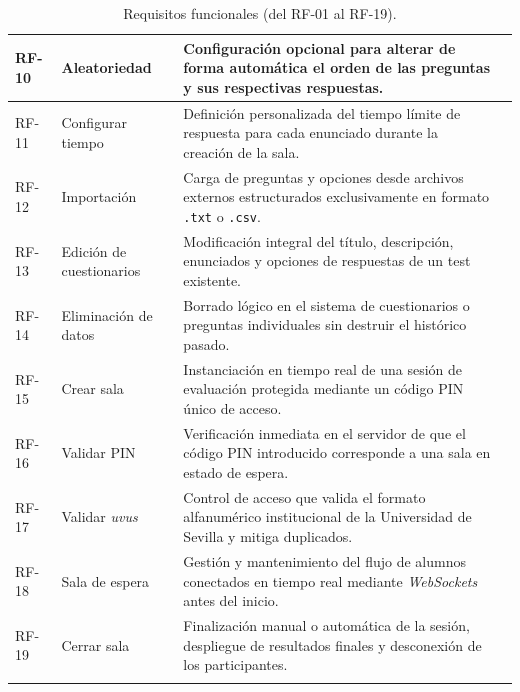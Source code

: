 \begin{table}[H]
{\begin{tabularx}{1.1\textwidth}{l P{2.4cm} Y c}
RF-10\label{req:10} & Aleatoriedad & Configuración opcional para alterar de forma automática el orden de las preguntas y sus respectivas respuestas. &  \\ \hline
RF-11\label{req:11} & Configurar tiempo & Definición personalizada del tiempo límite de respuesta para cada enunciado durante la creación de la sala. &  \\ \hline
RF-12\label{req:12} & Importación & Carga de preguntas y opciones desde archivos externos estructurados exclusivamente en formato \texttt{.txt} o \texttt{.csv}. &  \\ \hline
RF-13\label{req:13} & Edición de cuestionarios & Modificación integral del título, descripción, enunciados y opciones de respuestas de un test existente. &  \\ \hline
RF-14\label{req:14} & Eliminación de datos & Borrado lógico en el sistema de cuestionarios o preguntas individuales sin destruir el histórico pasado. &  \\ \hline
RF-15\label{req:15} & Crear sala & Instanciación en tiempo real de una sesión de evaluación protegida mediante un código PIN único de acceso. &  \\ \hline
RF-16\label{req:16} & Validar PIN & Verificación inmediata en el servidor de que el código PIN introducido corresponde a una sala en estado de espera. &  \\ \hline
RF-17\label{req:17} & Validar \textit{uvus} & Control de acceso que valida el formato alfanumérico institucional de la Universidad de Sevilla y mitiga duplicados. &  \\ \hline
RF-18\label{req:18} & Sala de espera & Gestión y mantenimiento del flujo de alumnos conectados en tiempo real mediante \textit{WebSockets} antes del inicio. &  \\ \hline
RF-19\label{req:19} & Cerrar sala & Finalización manual o automática de la sesión, despliegue de resultados finales y desconexión de los participantes. &  \\ \bighline
\end{tabularx}%
}
\caption{Requisitos funcionales (del RF-01 al RF-19).}
\label{tab:requisitos_funcionales_1}
\end{table}

